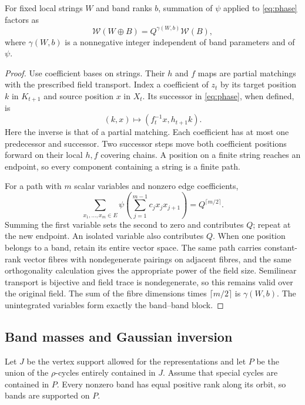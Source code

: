 \begin{lemma}\label{lem:pathsum}
For fixed local strings $W$ and band ranks $b$, summation of $\psi$ applied to \eqref{eq:phase} factors as
\[
 \mathcal W(W\oplus B)=Q^{\gamma(W,b)}\mathcal W(B),
\]
where $\gamma(W,b)$ is a nonnegative integer independent of band parameters and of $\psi$.
\end{lemma}
\begin{proof}
Use coefficient bases on strings. Their $h$ and $f$ maps are partial matchings with the prescribed field transport. Index a coefficient of $z_t$ by its target position $k$ in $K_{t+1}$ and source position $x$ in $X_t$. Its successor in \eqref{eq:phase}, when defined, is
\[
 (k,x)\longmapsto(f_t^{-1}x,h_{t+1}k).
\]
Here the inverse is that of a partial matching. Each coefficient has at most one predecessor and successor. Two successor steps move both coefficient positions forward on their local $h,f$ covering chains. A position on a finite string reaches an endpoint, so every component containing a string is a finite path.

For a path with $m$ scalar variables and nonzero edge coefficients,
\[
 \sum_{x_1,\ldots,x_m\in E}
 \psi\left(\sum_{j=1}^{m-1}c_jx_jx_{j+1}\right)=Q^{\lceil m/2\rceil}.
\]
Summing the first variable sets the second to zero and contributes $Q$; repeat at the new endpoint. An isolated variable also contributes $Q$. When one position belongs to a band, retain its entire vector space. The same path carries constant-rank vector fibres with nondegenerate pairings on adjacent fibres, and the same orthogonality calculation gives the appropriate power of the field size. Semilinear transport is bijective and field trace is nondegenerate, so this remains valid over the original field. The sum of the fibre dimensions times $\lceil m/2\rceil$ is $\gamma(W,b)$. The unintegrated variables form exactly the band--band block.
\end{proof}

\subsection{Band masses and Gaussian inversion}
Let $J$ be the vertex support allowed for the representations and let $P$ be the union of the $\rho$-cycles entirely contained in $J$. Assume that special cycles are contained in $P$. Every nonzero band has equal positive rank along its orbit, so bands are supported on $P$.

